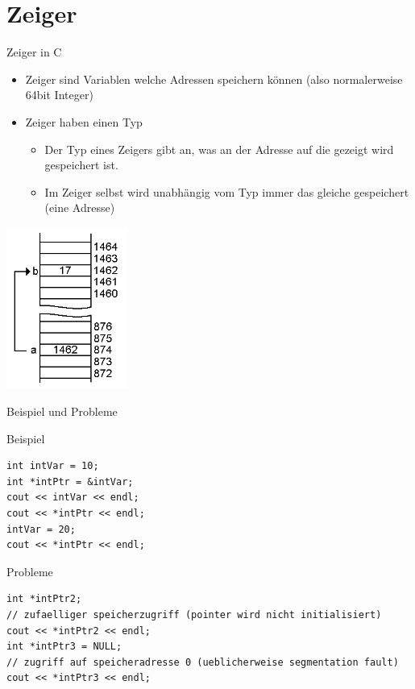 \documentclass[presentation]{beamer}
\begin{document}
\section{Zeiger}
\label{sec:org5f111d1}
\begin{frame}[label={sec:org6c33a77}]{Zeiger in C}
\begin{itemize}
\item Zeiger sind Variablen welche Adressen speichern können (also
normalerweise 64bit Integer)
\item Zeiger haben einen Typ
\begin{itemize}
\item Der Typ eines Zeigers gibt an, was an der Adresse auf die gezeigt
wird gespeichert ist.
\item Im Zeiger selbst wird unabhängig vom Typ immer das gleiche
gespeichert (eine Adresse)
\end{itemize}
\end{itemize}
\begin{center}
\includegraphics[width=0.3\textwidth]{img/pointer.png}
\end{center}
\end{frame}
\begin{frame}[label={sec:org9c337c3},fragile]{Beispiel und Probleme}
 \begin{block}{Beispiel}
\begin{verbatim}
int intVar = 10;
int *intPtr = &intVar;
cout << intVar << endl;
cout << *intPtr << endl;
intVar = 20;
cout << *intPtr << endl;
\end{verbatim}
\end{block}
\begin{block}{Probleme}
\begin{verbatim}
int *intPtr2;
// zufaelliger speicherzugriff (pointer wird nicht initialisiert)
cout << *intPtr2 << endl;
int *intPtr3 = NULL;
// zugriff auf speicheradresse 0 (ueblicherweise segmentation fault)
cout << *intPtr3 << endl;
\end{verbatim}
\end{block}
\end{frame}
\end{document}
